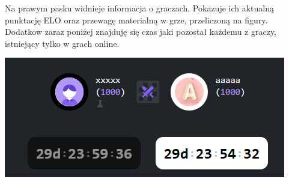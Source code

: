 \documentclass[twoside]{projektInzynierskiMS1}
\begin{document}
\noindent
\begin{minipage}[t]{0.45\textwidth} 
    \vspace{0pt} 
    \justifying 
    \noindent 
    Na prawym pasku widnieje informacja o graczach. Pokazuje ich aktualną punktację ELO oraz przewagę materialną w grze, przeliczoną na figury. Dodatkow zaraz poniżej znajduję się czas jaki pozostał każdemu z graczy, istniejący tylko w grach online.
\end{minipage} 
\hfill 
\begin{minipage}[t]{0.45\textwidth} 
    \vspace{0pt} 
    \centering 
    \includegraphics[width=\linewidth]{images/ins_min_players.png} 
\end{minipage}

\vspace{1cm}
\end{document}

